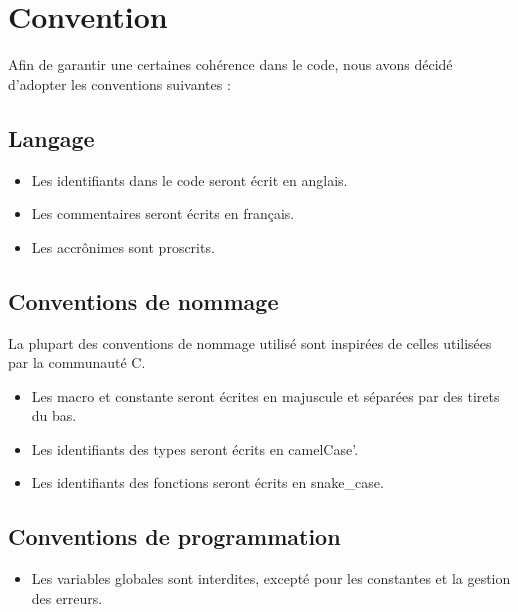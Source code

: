\section{Convention}

Afin de garantir une certaines cohérence dans le code, nous avons décidé d'adopter les conventions suivantes :

\subsection{Langage}

\begin{itemize}
    \item Les identifiants dans le code seront écrit en anglais.
    \item Les commentaires seront écrits en français.
    \item Les accrônimes sont proscrits.
\end{itemize}


\subsection{Conventions de nommage}

La plupart des conventions de nommage utilisé sont inspirées de celles utilisées par la communauté C.

\begin{itemize}
    \item Les macro et constante seront écrites en majuscule et séparées par des tirets du bas.
    \item Les identifiants des types seront écrits en camelCase'.
    \item Les identifiants des fonctions seront écrits en snake\_case.
\end{itemize}

\subsection{Conventions de programmation}

\begin{itemize}
    \item Les variables globales sont interdites, excepté pour les constantes et la gestion des erreurs.
\end{itemize}